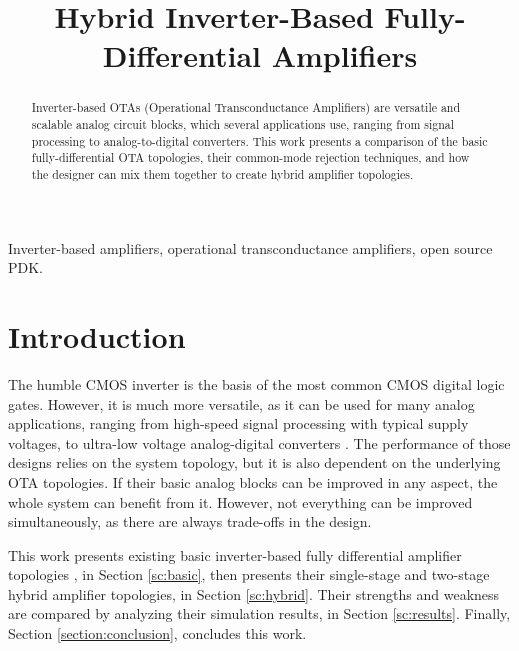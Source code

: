 \documentclass[conference]{IEEEtran}
\begin{document}
	
	\title{Hybrid Inverter-Based Fully-Differential Amplifiers\\
	}

	\author{
	}
	
	\maketitle
	
	\begin{abstract}
		Inverter-based OTAs (Operational Transconductance Amplifiers) are versatile and scalable analog circuit blocks, which several applications use, ranging from signal processing to analog-to-digital converters. This work presents a comparison of the basic fully-differential OTA topologies, their common-mode rejection techniques, and how the designer can mix them together to create hybrid amplifier topologies.
	\end{abstract}
	
	\begin{IEEEkeywords}
		Inverter-based amplifiers, operational transconductance amplifiers, open source PDK.
	\end{IEEEkeywords}
	
	\section{Introduction}

The humble CMOS inverter is the basis of the most common CMOS digital logic gates. However, it is much more versatile, as it can be used for many analog applications, ranging from high-speed signal processing \cite{nauta1992cmos,barthelemy2008ota} with typical supply voltages, to ultra-low voltage analog-digital converters \cite{vieru2012ultra,lv2019inverter,benvenuti2021design}. The performance of those designs relies on the system topology, but it is also dependent on the underlying OTA topologies. If their basic analog blocks can be improved in any aspect, the whole system can benefit from it. However, not everything can be improved simultaneously, as there are always trade-offs in the design.

This work presents existing basic inverter-based fully differential amplifier topologies \cite{nauta1992cmos,barthelemy2008ota,vieru2011inverter,manfredini2020ultra}, in Section \ref{sc:basic}, then presents their single-stage and two-stage hybrid amplifier topologies, in Section \ref{sc:hybrid}. Their strengths and weakness are compared by analyzing their simulation results, in Section \ref{sc:results}. Finally, Section \ref{section:conclusion}, concludes this work.
\end{document}
